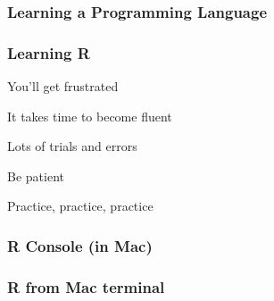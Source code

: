 \documentclass[12pt]{beamer}\usepackage[]{graphicx}\usepackage[]{color}
\begin{document}

\begin{frame}
\frametitle{Learning a Programming Language}
\begin{center}
\end{center}
\end{frame}


\begin{frame}
\frametitle{Learning R}

\bi
  \item You'll get frustrated
  \item It takes time to become fluent
  \item Lots of trials and errors
  \item Be patient
  \item Practice, practice, practice
\ei
\eb

\end{frame}


\begin{frame}
\frametitle{R Console (in Mac)}

\begin{center}
\end{center}

\end{frame}


\begin{frame}
\frametitle{R from Mac terminal}

\begin{center}
\end{center}

\end{frame}


\begin{frame}
\begin{center}
\Huge{}
\end{center}
\end{frame}

\end{document}
